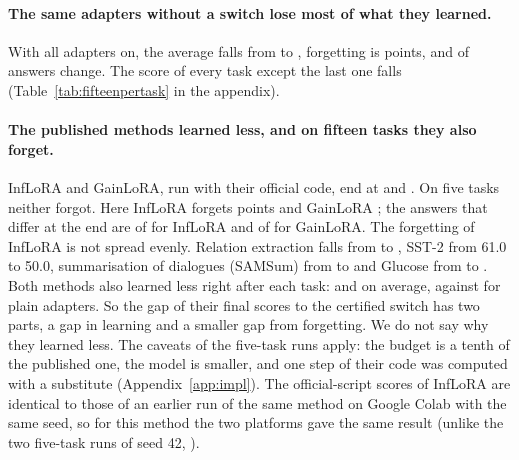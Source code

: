 \paragraph{The same adapters without a switch lose most of what they learned.} With all adapters on,
the average falls from \FifteenPlainLearned{} to \FifteenPlainAP{}, forgetting is
\FifteenPlainFT{} points, and \FifteenPlainChanged{} of \FifteenPlainCompared{} answers change. The
score of every task except the last one falls (Table~\ref{tab:fifteenpertask} in the appendix).

\paragraph{The published methods learned less, and on fifteen tasks they also forget.} InfLoRA and
GainLoRA, run with their official code, end at \FifteenInfAP{} and \FifteenGainAP{}. On five tasks
neither forgot. Here InfLoRA forgets \FifteenInfFT{} points and GainLoRA \FifteenGainFT{}; the
answers that differ at the end are \FifteenInfChanged{} of \FifteenInfCompared{} for InfLoRA and
\FifteenGainChanged{} of \FifteenGainCompared{} for GainLoRA. The forgetting of InfLoRA is not
spread evenly. Relation extraction falls from \FifteenInfRelationLearned{} to
\FifteenInfRelationEnd{}, SST-2 from 61.0 to 50.0, summarisation of dialogues (SAMSum) from \FifteenInfSamsumLearned{} to
\FifteenInfSamsumEnd{} and Glucose from \FifteenInfGlucoseLearned{} to \FifteenInfGlucoseEnd{}. Both
methods also learned less right after each task: \FifteenInfLearned{} and \FifteenGainLearned{} on
average, against \FifteenCertLearned{} for plain adapters. So the gap of their final scores to the
certified switch has two parts, a gap in learning and a smaller gap from forgetting. We do not say
why they learned less. The caveats of the five-task runs apply: the budget is a tenth of the
published one, the model is smaller, and one step of their code was computed with a substitute
(Appendix~\ref{app:impl}). The official-script scores of InfLoRA are identical to those of an earlier run of the same method on Google Colab with the same seed, so for
this method the two platforms gave the same result (unlike the two five-task runs of seed 42, \fivefull{}).

